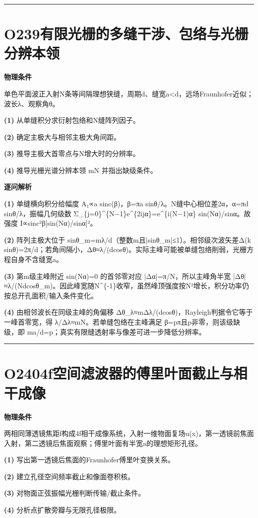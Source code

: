 \documentclass[UTF8,a4paper,11pt,oneside,openany]{ctexbook}
\begin{document}
\par\bigskip\hrule\bigskip
\section*{O239\quad 有限光栅的多缝干涉、包络与光栅分辨本领}
\textbf{物理条件}\par 单色平面波正入射N条等间隔理想狭缝，周期d、缝宽a<d，远场Fraunhofer近似；波长λ、观察角θ。
\par\noindent\textbf{(1)} 从单缝积分求衍射包络和N缝阵列因子。
\par\noindent\textbf{(2)} 确定主极大与相邻主极大角间距。
\par\noindent\textbf{(3)} 推导主极大首零点与N增大时的分辨率。
\par\noindent\textbf{(4)} 推导光栅光谱分辨本领 mN 并指出缺级条件。

\par\medskip\noindent\textbf{逐问解析}
\par\noindent\textbf{(1)} 单缝横向积分给幅度 A₁∝a sinc(β)，β=πa sinθ/λ。N缝中心相位差2α，α=πd sinθ/λ，振幅几何级数 Σ\_\{j=0\}\textasciicircum{}\{N−1\}e\textasciicircum{}\{2ijα\}=e\textasciicircum{}\{i(N−1)α\} sin(Nα)/sinα。故强度 I∝sinc²β[sin(Nα)/sinα]²。
\par\noindent\textbf{(2)} 阵列主极大位于 sinθ\_m=mλ/d（整数m且|sinθ\_m|≤1）。相邻级次波矢差Δ(k sinθ)=2π/d；若角间隔小，Δθ≈λ/(dcosθ)。实际主峰可能被单缝包络削弱，光栅方程自身不含缝宽a。
\par\noindent\textbf{(3)} 第m级主峰附近 sin(Nα)=0 的首邻零对应 |Δα|=π/N，所以主峰角半宽 |Δθ|≈λ/(Ndcosθ\_m)。因此峰宽随N\textasciicircum{}\{-1\}收窄，虽然峰顶强度按N²增长，积分功率仍按总开孔面积/输入条件变化。
\par\noindent\textbf{(4)} 由相邻波长在同级主峰的角偏移 Δθ\_λ≈mΔλ/(dcosθ)，Rayleigh判据令它等于一峰首零宽，得 λ/Δλ≈mN。若单缝包络在主峰满足 β=pπ且p非零，则该级缺级，即 ma/d=p；真实有限缝透射率与像差可进一步降低分辨率。

\par\bigskip\hrule\bigskip
\section*{O240\quad 4f空间滤波器的傅里叶面截止与相干成像}
\textbf{物理条件}\par 两相同薄透镜焦距f构成4f相干成像系统，入射一维物面复场u(x)，第一透镜前焦面入射，第二透镜后焦面观察；傅里叶面有半宽a的理想矩形孔径。
\par\noindent\textbf{(1)} 写出第一透镜后焦面的Fraunhofer傅里叶变换关系。
\par\noindent\textbf{(2)} 建立孔径空间频率截止和像面卷积核。
\par\noindent\textbf{(3)} 对物面正弦振幅光栅判断传输/截止条件。
\par\noindent\textbf{(4)} 分析点扩散旁瓣与无限孔径极限。
\end{document}
